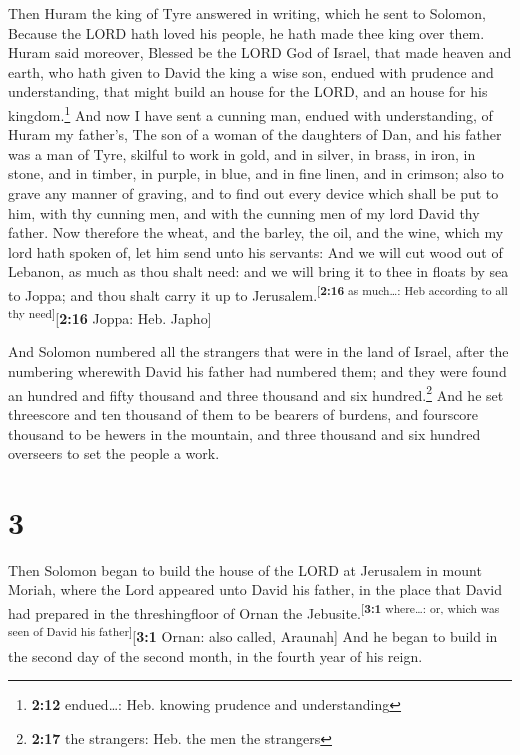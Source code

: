 Then Huram the king of Tyre answered in writing, which
he sent to Solomon, Because the LORD hath loved his people, he hath made
thee king over them.  Huram said moreover, Blessed be the
LORD God of Israel, that made heaven and earth, who hath given to David
the king a wise son, endued with prudence and understanding, that might
build an house for the LORD, and an house for his kingdom.\footnote{\textbf{2:12}
  endued\ldots: Heb. knowing prudence and understanding} 
And now I have sent a cunning man, endued with understanding, of Huram
my father's,  The son of a woman of the daughters of Dan,
and his father was a man of Tyre, skilful to work in gold, and in
silver, in brass, in iron, in stone, and in timber, in purple, in blue,
and in fine linen, and in crimson; also to grave any manner of graving,
and to find out every device which shall be put to him, with thy cunning
men, and with the cunning men of my lord David thy father.
 Now therefore the wheat, and the barley, the oil, and
the wine, which my lord hath spoken of, let him send unto his servants:
 And we will cut wood out of Lebanon, as much as thou
shalt need: and we will bring it to thee in floats by sea to Joppa; and
thou shalt carry it up to Jerusalem.\textsuperscript{{[}\textbf{2:16} as
much\ldots: Heb according to all thy need{]}}{[}\textbf{2:16} Joppa:
Heb. Japho{]}

 And Solomon numbered all the strangers that were in the
land of Israel, after the numbering wherewith David his father had
numbered them; and they were found an hundred and fifty thousand and
three thousand and six hundred.\footnote{\textbf{2:17} the strangers:
  Heb. the men the strangers}  And he set threescore and
ten thousand of them to be bearers of burdens, and fourscore thousand to
be hewers in the mountain, and three thousand and six hundred overseers
to set the people a work.

\hypertarget{section-2}{%
\section{3}\label{section-2}}

 Then Solomon began to build the house of the LORD at
Jerusalem in mount Moriah, where the Lord appeared unto David his
father, in the place that David had prepared in the threshingfloor of
Ornan the Jebusite.\textsuperscript{{[}\textbf{3:1} where\ldots: or,
which was seen of David his father{]}}{[}\textbf{3:1} Ornan: also
called, Araunah{]}  And he began to build in the second
day of the second month, in the fourth year of his reign.

